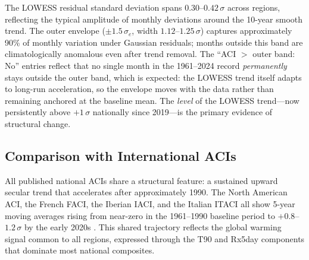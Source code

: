 \documentclass[12pt]{article}
\begin{document}
\medskip
\begin{table}[H]
\centering\small
\renewcommand{\arraystretch}{1.2}
\setlength{\tabcolsep}{6pt}
\caption{LOWESS residual standard deviation ($\sigma_e$) and outer envelope width ($3\,\sigma_e = \pm 1.5\,\sigma_e$) for the ACI-CO monthly composite, by region (LOWESS bandwidth $f=0.15$, 1961--2024). ``ACI $>$ outer band'' indicates whether the post-2010 5-year moving average consistently exceeds the $+1.5\,\sigma_e$ envelope.}
\label{tab:boot_widths}
\end{table}
\medskip
\noindent The LOWESS residual standard deviation spans $0.30$--$0.42\,\sigma$ across regions, reflecting the typical amplitude of monthly deviations around the 10-year smooth trend. The outer envelope ($\pm 1.5\,\sigma_e$, width $1.12$--$1.25\,\sigma$) captures approximately 90\% of monthly variation under Gaussian residuals; months outside this band are climatologically anomalous even after trend removal. The ``ACI $>$ outer band: No'' entries reflect that no single month in the 1961--2024 record \emph{permanently} stays outside the outer band, which is expected: the LOWESS trend itself adapts to long-run acceleration, so the envelope moves with the data rather than remaining anchored at the baseline mean. The \emph{level} of the LOWESS trend---now persistently above $+1\,\sigma$ nationally since 2019---is the primary evidence of structural change.
 
\subsection{Comparison with International ACIs}
 
All published national ACIs share a structural feature: a sustained upward secular trend that accelerates after approximately 1990. The North American ACI, the French FACI, the Iberian IACI, and the Italian ITACI all show 5-year moving averages rising from near-zero in the 1961--1990 baseline period to $+0.8$--$1.2\,\sigma$ by the early 2020s \citep{aci2016,garrido2023faci,zhou2023iaci,rogo2025}. This shared trajectory reflects the global warming signal common to all regions, expressed through the T90 and Rx5day components that dominate most national composites.
\end{document}
